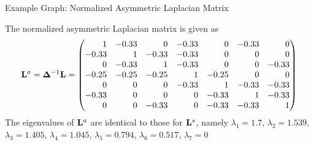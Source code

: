 \begin{frame}{Example Graph: Normalized Asymmetric Laplacian Matrix}
\begin{figure}
    \centerline{
	}
		\vspace{-0.2in}
 \end{figure}
\small
    The normalized asymmetric Laplacian matrix is given as
    \begin{align*}
        \bL^a = \bDelta^{-1}\bL =
        \amatr{r}{
         1   & -0.33&  0   & -0.33&  0   & -0.33&  0\\
        -0.33&  1   & -0.33& -0.33&  0   &  0   &  0\\
         0   & -0.33&  1   & -0.33&  0   &  0   & -0.33\\
        -0.25& -0.25& -0.25&  1   & -0.25&  0   &  0\\
         0   &  0   &  0   & -0.33&  1   & -0.33& -0.33\\
        -0.33&  0   &  0   &  0   & -0.33&  1   & -0.33\\
         0   &  0   & -0.33&  0   & -0.33& -0.33&  1}
    \end{align*}
    The eigenvalues of $\mathbf{L}^a$ are identical to those for $\mathbf{L}^s$,
    namely
    $\lambda_1 = 1.7$,
    $\lambda_2 =1.539$,
    $\lambda_3 = 1.405$,
    $\lambda_4 =1.045$,
    $\lambda_5 =0.794$,
    $\lambda_6 =0.517$,
    $\lambda_7 = 0 $
  \end{frame}


